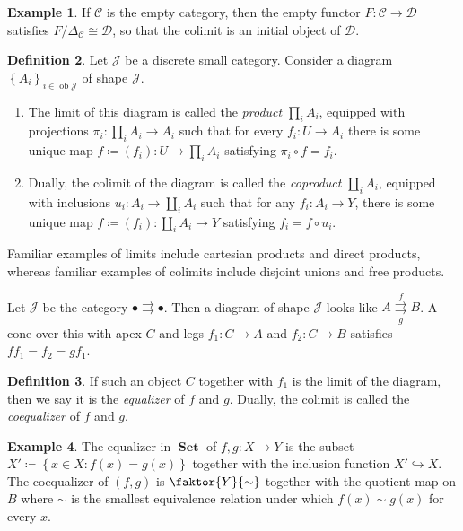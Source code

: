 \documentclass[10pt,letterpaper,cm]{nupset}
\theoremstyle{definition}
\newtheorem{definition}{Definition}[section]
\newtheorem{exmp}[definition]{Example}
\theoremstyle{theorem}
\theoremstyle{remark}
\newcommand{\1}{\mathbf{1}}
\renewcommand{\c}{\mathscr{C}}
\renewcommand{\d}{\mathscr{D}}
\renewcommand{\j}{\mathscr{J}}
\newcommand{\0}{\vec 0}
\DeclareMathOperator{\ob}{ob}
\DeclareMathOperator{\set}{\mathbf{Set}}
\begin{document}
\begin{exmp}
If $\c$ is the empty category, then the empty functor $F: \c \to \d$ satisfies $F/\Delta_{\c}\cong \d$, so that the colimit is an initial object of $\d$.
\end{exmp}

\begin{definition}
Let $\j$ be a discrete small category. Consider a diagram  $\left\{A_i\right\}_{i\in \ob{\j}}$ of shape $\j$. 
\begin{enumerate}
\item The limit of this diagram is called the \textit{product} $\prod_i A_i$, equipped with projections $\pi_i : \prod_i A_i \to A_i$ such that for every $f_{i} : U \to A_i$ there is some unique map $f\coloneqq \left(f_i\right) : U \to \prod_i A_i$ satisfying $\pi_i \circ f = f_i$. 
\item  Dually, the colimit of the diagram is called the \textit{coproduct} $\coprod_i A_i$, equipped with inclusions $u_i : A_i \to \coprod_i A_i$ such that for any $f_i : A_i \to Y$, there is some unique map $f\coloneqq \left(f_i\right) : \coprod_i A_i \to Y$ satisfying $f_i = f \circ u_i$.
\end{enumerate}
\end{definition}

\smallskip

Familiar examples of limits include cartesian products and direct products, whereas familiar examples of colimits include disjoint unions and free products. 


\smallskip

Let $\j$ be the category $\bullet \rightrightarrows \bullet$. Then  a diagram of shape $\j$ looks like $A \overset{f}{\underset{g}{\rightrightarrows}} B$. A cone over this with apex $C$ and legs $f_1 : C \to A$ and $f_2 : C \to B$ satisfies $ff_1=f_2 = gf_1$.

\begin{definition}
If such an object $C$ together with $f_1$ is the limit of the diagram, then we say it is the \textit{equalizer} of $f$ and $g$. Dually, the colimit is called the \textit{coequalizer} of $f$ and $g$.
\end{definition}

\begin{exmp}\label{set}
The equalizer in $\set$ of $f, g: X \to Y$ is the subset $X'\coloneqq \left\{x \in X : f(x) = g(x)\right\}$ together with the inclusion function $X' \hookrightarrow X$. The coequalizer of $\left(f, g\right)$ is $\faktor{Y}{\sim}$ together with the quotient map on $B$ where $\sim$ is the smallest equivalence relation under which $f(x) \sim g(x)$ for every $x$.
\end{exmp}
\end{document}
